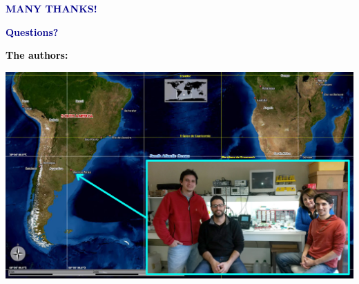\documentclass[handout]{beamer}
\begin{document}
\begin{frame}[plain,t]
\vspace{0.4cm}

\centering
\Huge
\textcolor{darkblue}{\textbf{MANY THANKS!}}

\Large
\textcolor{darkblue}{\textbf{Questions?}}

\vspace{0.6pc}

\normalsize

\begin{flushleft}
\hspace{0.3cm}
\textcolor{black}{\textbf{The authors:}}
\end{flushleft}

\includegraphics[width=0.85\paperwidth]{imagenes/Argentina_FitoAcusticos.jpg}

\end{frame}

%
%
%
%
%
\end{document}
